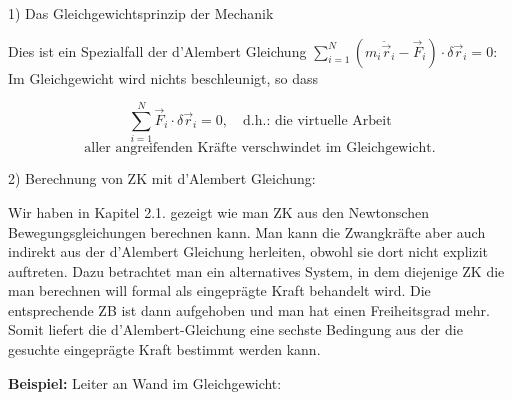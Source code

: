 \documentclass[10pt, letterpaper]{article}
\begin{document}
1) Das Gleichgewichtsprinzip der Mechanik

Dies ist ein Spezialfall der d'Alembert Gleichung $\sum_{i=1}^N(m_i\ddot{\vec{r}}_i-\vec{F}_i)\cdot\delta\vec{r}_i=0$:
Im Gleichgewicht wird nichts beschleunigt, so dass

\[\sum_{i=1}^N \vec{F}_i\cdot\delta\vec{r}_i = 0, \quad \text{d.h.: die virtuelle Arbeit}\]
\[\text{aller angreifenden Kräfte verschwindet im Gleichgewicht.}\]


2) Berechnung von ZK mit d'Alembert Gleichung:

Wir haben in Kapitel 2.1. gezeigt wie man ZK aus den Newtonschen Bewegungsgleichungen berechnen kann. Man kann die Zwangkräfte aber auch indirekt aus der d'Alembert Gleichung herleiten, obwohl sie dort nicht explizit auftreten. Dazu betrachtet man ein alternatives System, in dem diejenige ZK die man berechnen will formal als eingeprägte Kraft
behandelt wird. Die entsprechende ZB ist dann aufgehoben und man hat einen Freiheitsgrad mehr. Somit liefert die d'Alembert-Gleichung eine sechste Bedingung aus der die gesuchte eingeprägte Kraft bestimmt werden kann.



\textbf{Beispiel:} Leiter an Wand im Gleichgewicht:

\end{document}
